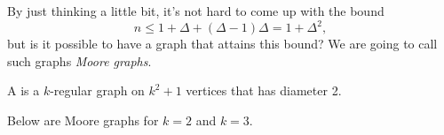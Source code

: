 By just thinking a little bit, it's not hard to come up with the bound
$$
n \leq 1 + \Delta + (\Delta - 1)\Delta = 1 + \Delta^2,
$$
but is it possible to have a graph that attains this bound? We are going to call such graphs \emph{Moore graphs}.

\begin{definition}
	A  is a $k$-regular graph on $k^2 + 1$ vertices that has diameter 2.
\end{definition}


\begin{example}
	Below are Moore graphs for $k = 2$ and $k = 3$.
	\begin{center}
		


\begin{tikzpicture}[x=0.75pt,y=0.75pt,yscale=-1,xscale=1]


\end{tikzpicture}
\end{center}
\end{example}
